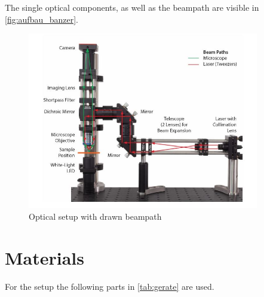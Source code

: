 \documentclass[12pt,english]{scrartcl}
\begin{document}
The single optical components, as well as the beampath are visible in
\autoref{fig:aufbau_banzer}.
\begin{figure}[H]
	\begin{center}
		\includegraphics[width =0.9\textwidth]{./figures/aufbau_banzer.JPG}
	\end{center}
	\caption[Optical setup] { Optical setup with drawn beampath
	}\label{fig:aufbau_banzer}%
\end{figure}

\section{Materials}\label{sec:geraeteliste}

For the setup the following parts in \autoref{tab:gerate} are used.
\end{document}
